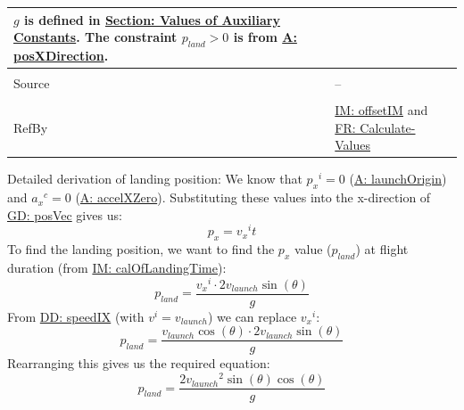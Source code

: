 \documentclass[12pt]{article}
\begin{document}
\begin{minipage}{\textwidth}
\begin{tabular}{>{\raggedright}p{}>{\raggedright\arraybackslash}p{}}
        $g$ is defined in \hyperref[Sec:AuxConstants]{Section: Values of Auxiliary Constants}.
        The constraint ${p_{land}}>0$ is from \hyperref[posXDirection]{A: posXDirection}.
\\ \midrule \\
Source & --
\\ \midrule \\
RefBy & \hyperref[IM:offsetIM]{IM: offsetIM} and \hyperref[calcValues]{FR: Calculate-Values}
\\ \bottomrule \end{tabular}
\end{minipage}
Detailed derivation of landing position:
We know that ${{p_{x}}^{i}}=0$ (\hyperref[launchOrigin]{A: launchOrigin}) and ${{a_{x}}^{c}}=0$ (\hyperref[accelXZero]{A: accelXZero}). Substituting these values into the x-direction of \hyperref[GD:posVec]{GD: posVec} gives us:
\begin{displaymath}
{p_{x}}={{v_{x}}^{i}} t
\end{displaymath}
To find the landing position, we want to find the ${p_{x}}$ value (${p_{land}}$) at flight duration (from \hyperref[IM:calOfLandingTime]{IM: calOfLandingTime}):
\begin{displaymath}
{p_{land}}=\frac{{{v_{x}}^{i}}\cdot{}2 {v_{launch}} \sin\left(θ\right)}{g}
\end{displaymath}
From \hyperref[DD:speedIX]{DD: speedIX} (with ${v^{i}}={v_{launch}}$) we can replace ${{v_{x}}^{i}}$:
\begin{displaymath}
{p_{land}}=\frac{{v_{launch}} \cos\left(θ\right)\cdot{}2 {v_{launch}} \sin\left(θ\right)}{g}
\end{displaymath}
Rearranging this gives us the required equation:
\begin{displaymath}
{p_{land}}=\frac{2 {v_{launch}}^{2} \sin\left(θ\right) \cos\left(θ\right)}{g}
\end{displaymath}
\par~
\end{document}
